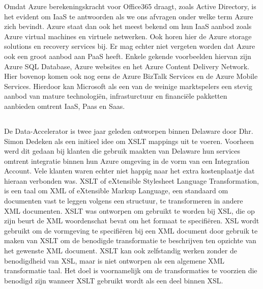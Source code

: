 Omdat Azure berekeningskracht voor Office365 draagt, zoals Active Directory, is het evident om IaaS te antwoorden als we ons afvragen onder welke term Azure zich bevindt. Azure staat dan ook het meest bekend om hun IaaS aanbod zoals Azure virtual machines en virtuele netwerken. Ook horen hier de Azure storage solutions en recovery services bij. Er mag echter niet vergeten worden dat Azure ook een groot aanbod aan PaaS heeft. Enkele gekende voorbeelden hiervan zijn Azure SQL Database, Azure websites en het Azure Content Delivery Network. Hier bovenop komen ook nog eens de Azure BizTalk Services en de Azure Mobile Services. Hierdoor kan Microsoft als een van de weinige marktspelers een stevig aanbod van mature technologiën, infrasturctuur en financiële pakketten aanbieden omtrent IaaS, Paas en Saas.\autocite{Copeland2015}

\subsection{}%
\label{sec:Ontstaan Data-Accelerator}

De Data-Accelerator is twee jaar geleden ontworpen binnen Delaware door Dhr. Simon Dedeken als een initieel idee om XSLT mappings uit te voeren. Voorheen werd dit gedaan bij klanten die gebruik maakten van Delaware hun services omtrent integratie binnen hun Azure omgeving in de vorm van een Integration Account. Vele klanten waren echter niet happig naar het extra kostenplaatje dat hieraan verbonden was. XSLT of eXtensible Stylesheet Language Transformation, is een taal om XML of eXtensible Markup Language, een standaard om documenten vast te leggen volgens een structuur, te transformeren in andere XML documenten. XSLT was ontworpen om gebruikt te worden bij XSL, die op zijn beurt de XML woordenschat bevat om het formaat te specifiëren. XSL wordt gebruikt om de vormgeving te specifiëren bij een XML document door gebruik te maken van XSLT om de benodigde transformatie te beschrijven ten opzichte van het gewenste XML document. XSLT kan ook zelfstandig werken zonder de benodigdheid van XSL, maar is niet ontworpen als een algemene XML transformatie taal. Het doel is voornamelijk om de transformaties te voorzien die benodigd zijn wanneer XSLT gebruikt wordt als een deel binnen XSL.\autocite{W3C1999}

